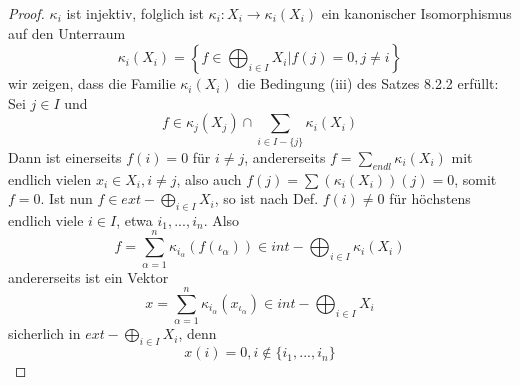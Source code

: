 \documentclass[12pt,a4paper]{article}
\theoremstyle{definition}
\theoremstyle{remark}
\begin{document}
	\begin{proof}
		$\kappa_i$ ist injektiv, folglich ist $\kappa_i: X_i \rightarrow \kappa_i(X_i)$ ein kanonischer Isomorphismus auf den Unterraum
		\begin{equation}
			\kappa_i(X_i) = \left\{ f \in \bigoplus_{i \in I} X_i \left| f(j)=0, j \neq i \right. \right\}
		\end{equation}
		wir zeigen, dass die Familie $\kappa_i(X_i)$ die Bedingung (iii) des Satzes 8.2.2 erfüllt: \\
		Sei $j \in I$ und
		\begin{equation}
			f \in \kappa_j(X_j) \cap \sum_{i \in I-\{ j \}} \kappa_i(X_i)
		\end{equation}
		Dann ist einerseits $f(i) =0$ für $i \neq j$, andererseits $f = \sum_{ endl} \kappa_i(X_i)$ mit endlich vielen $x_i \in X_i, i \neq j$, also auch $f(j) = \sum (\kappa_i(X_i))(j)=0$, somit $f=0$. Ist nun $f \in ext - \bigoplus_{i \in I} X_i$, so ist nach Def. $f(i) \neq 0$ für höchstens endlich viele $i \in I$, etwa $i_1,...,i_n$. Also
		\begin{equation}
			f = \sum_{\alpha =1}^n \kappa_{i_{\alpha}}(f(\iota_{\alpha})) \in int- \bigoplus_{i \in I} \kappa_i(X_{i})
		\end{equation}
		andererseits ist ein Vektor
		\begin{equation}
			x = \sum_{\alpha =1}^n \kappa_{i_{\alpha}} (x_{\iota_{\alpha}}) \in int-\bigoplus_{i \in I} X_i
		\end{equation}
		sicherlich in $ext-\bigoplus_{i \in I}X_i$, denn
		\begin{equation}
			x(i) =0, i \notin \{ i_1,...,i_n \}
		\end{equation}
	\end{proof}
\end{document}
